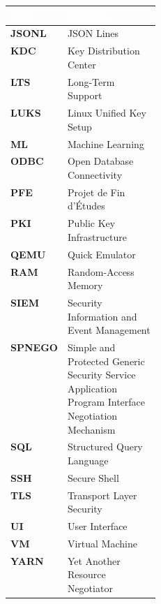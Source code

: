 \hfill
\begin{minipage}[t]{0.49\textwidth}
\vspace{0pt}
\begin{tabularx}{\linewidth}{|L{0.25\linewidth}|Y|}
\hline
{}
\textcolor{white}{\textbf{Abbr.}} & \textcolor{white}{\textbf{Meaning}} \\
\hline
\textbf{JSONL} & JSON Lines \\
\textbf{KDC} & Key Distribution Center \\
\textbf{LTS} & Long-Term Support \\
\textbf{LUKS} & Linux Unified Key Setup \\
\textbf{ML} & Machine Learning \\
\textbf{ODBC} & Open Database Connectivity \\
\textbf{PFE} & Projet de Fin d'\'Etudes \\
\textbf{PKI} & Public Key Infrastructure \\
\textbf{QEMU} & Quick Emulator \\
\textbf{RAM} & Random-Access Memory \\
\textbf{SIEM} & Security Information and Event Management \\
\textbf{SPNEGO} & Simple and Protected Generic Security Service Application Program Interface Negotiation Mechanism \\
\textbf{SQL} & Structured Query Language \\
\textbf{SSH} & Secure Shell \\
\textbf{TLS} & Transport Layer Security \\
\textbf{UI} & User Interface \\
\textbf{VM} & Virtual Machine \\
\textbf{YARN} & Yet Another Resource Negotiator \\
\hline
\end{tabularx}
\end{minipage}

\endgroup

\clearpage
